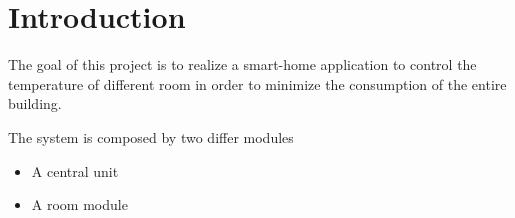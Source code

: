 \section{Introduction}
The goal of this project is to realize a smart-home application to control the temperature of different room in order to minimize the consumption of the entire building.

The system is composed by two differ modules
\begin{itemize}
	\item A central unit
	\item A room module
\end{itemize}